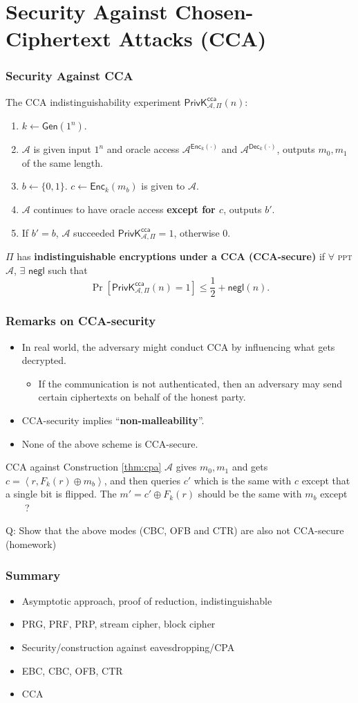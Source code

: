 \section{Security Against Chosen-Ciphertext Attacks (CCA)}
\begin{frame}\frametitle{Security Against CCA}
The CCA indistinguishability experiment $\mathsf{PrivK}^{\mathsf{cca}}_{\mathcal{A},\Pi}(n)$:
\begin{enumerate}
	\item $k \gets \mathsf{Gen}(1^n)$.
	\item $\mathcal{A}$ is given input $1^n$ and oracle access $\mathcal{A}^{\mathsf{Enc}_k(\cdot)}$ and $\mathcal{A}^{\mathsf{Dec}_k(\cdot)}$, outputs $m_0, m_1$ of the same length.
	\item $b \gets \{0,1\}$. $c \gets \mathsf{Enc}_k(m_b)$ is given to $\mathcal{A}$.
	\item $\mathcal{A}$ continues to have oracle access \alert{\textbf{except for $c$}}, outputs $b'$.
	\item If $b' = b$, $\mathcal{A}$ succeeded $\mathsf{PrivK}^{\mathsf{cca}}_{\mathcal{A},\Pi}=1$, otherwise 0.
\end{enumerate}
\begin{definition}
$\Pi$ has \textbf{indistinguishable encryptions under a CCA (CCA-secure)} if $\forall$ \textsc{ppt} $\mathcal{A}$, $\exists$ $\mathsf{negl}$ such that
\[ \Pr\left[\mathsf{PrivK}^{\mathsf{cca}}_{\mathcal{A},\Pi}(n)=1\right] \le \frac{1}{2} + \mathsf{negl}(n).
\]
\end{definition}
\end{frame}
\begin{frame}\frametitle{Remarks on CCA-security}
\begin{itemize}
\item In real world, the adversary might conduct CCA by influencing what gets decrypted.
\begin{itemize}
\item If the communication is not authenticated, then an adversary may send certain ciphertexts on behalf of the honest party.
\end{itemize}
\item CCA-security implies ``\textbf{non-malleability}''.
\item None of the above scheme is CCA-secure. 
\end{itemize}
\begin{exampleblock}{CCA against Construction \ref{thm:cpa}}
$\mathcal{A}$ gives $m_{0}, m_{1}$ and gets $c = \left<r, F_k(r)\oplus m_{b}\right>$, 
and then queries $c'$ which is the same with $c$ except that a single bit is flipped. 
The $m' = c' \oplus F_k(r)$ should be the same with $m_{b}$ \alert{except \underline{$\qquad$}?}
\end{exampleblock}
\alert{Q: Show that the above modes (CBC, OFB and CTR) are also not CCA-secure (homework)}
\end{frame}
\begin{frame}\frametitle{Summary}
\begin{itemize}
\item Asymptotic approach, proof of reduction, indistinguishable
\item PRG, PRF, PRP, stream cipher, block cipher
\item Security/construction against eavesdropping/CPA
\item EBC, CBC, OFB, CTR
\item CCA
\end{itemize}
\end{frame}

